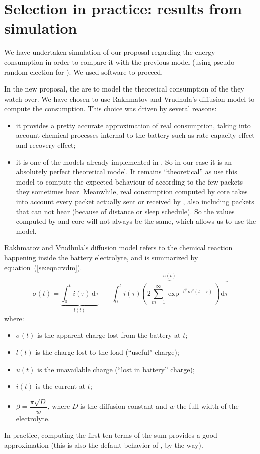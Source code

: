 \section{Selection in practice: results from simulation}
\label{se:sec:simul}

We have undertaken simulation of our proposal regarding the energy consumption in order to compare it with the previous model (using pseudo-random election for \cns).
We used \ns software to proceed.

In the new proposal, the \vns are to model the theoretical consumption of the \cns they watch over.
We have chosen to use Rakhmatov and Vrudhula's diffusion model\cite{RV01} to compute the consumption.
This choice was driven by several reasons:
\begin{itemize}
    \item it provides a pretty accurate approximation of real consumption, taking into account chemical processes internal to the battery such as rate capacity effect and recovery effect;
    \item it is one of the models already implemented in \ns. So in our case it is an absolutely perfect theoretical model.
        It remains ``theoretical'' as \vns use this model to compute the expected behaviour of \cns according to the few packets they sometimes hear. Meanwhile, real \cns consumption computed by \ns core takes into account every packet actually sent or received by \cns, also including packets that \vns can not hear (because of distance or sleep schedule). So the values computed by \vns and \ns core will not always be the same, which allows us to use the model.
\end{itemize}
Rakhmatov and Vrudhula's diffusion model refers to the chemical reaction happening inside the battery electrolyte, and is summarized by equation~(\ref{se:eqn:rvdm}).
\begin{equation}
    \label{se:eqn:rvdm}
    \sigma(t) = \underbrace{\int_{0}^{t} i(\tau) \, \mathrm d\tau}_{l(t)} \;+\; \overbrace{\int_{0}^{t} i(\tau) \left(2 \sum_{m=1}^{\infty} \exp^{-\beta^2 m^2 (t-r)} \right) \mathrm d\tau}^{u(t)}
\end{equation}
where:
\begin{itemize}
    \item $\sigma(t)$ is the apparent charge lost from the battery at $t$;
    \item $l(t)$ is the charge lost to the load (``useful'' charge);
    \item $u(t)$ is the unavailable charge (``lost in battery'' charge);
    \item $i(t)$ is the current at $t$;
    \item $\beta = \dfrac{\pi\sqrt{D}}{w}$, where $D$ is the diffusion constant and $w$ the full width of the electrolyte.
\end{itemize}
In practice, computing the first ten terms of the sum provides a good approximation (this is also the default behavior of \ns, by the way).

